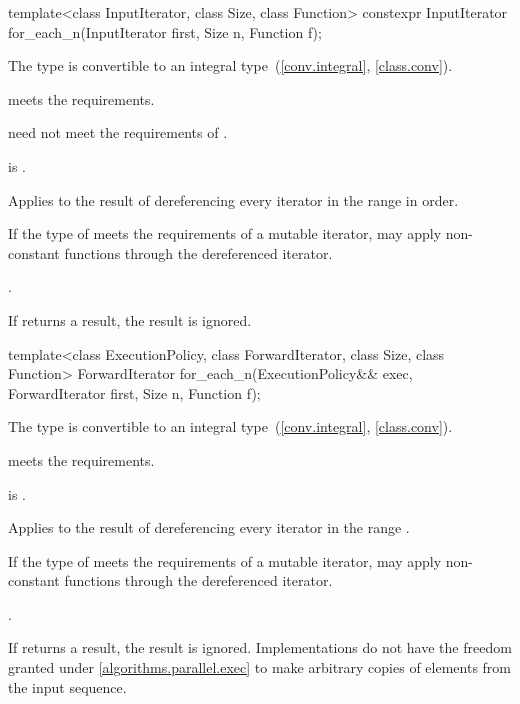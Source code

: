 %
\begin{itemdecl}
template<class InputIterator, class Size, class Function>
  constexpr InputIterator for_each_n(InputIterator first, Size n, Function f);
\end{itemdecl}

\begin{itemdescr}
\pnum
\mandates
The type  is convertible
to an integral type~(\ref{conv.integral}, \ref{class.conv}).

\pnum
\expects
{} meets the  requirements.
\begin{note}
 need not meet
the requirements of .
\end{note}

\pnum
\expects
{} is .

\pnum
\effects
Applies  to the result of dereferencing
every iterator in the range  in order.
\begin{note}
If the type of  meets the requirements of a mutable iterator,
 may apply non-constant functions through the dereferenced iterator.
\end{note}

\pnum
\returns
{}.

\pnum
\remarks
If  returns a result, the result is ignored.
\end{itemdescr}

%
\begin{itemdecl}
template<class ExecutionPolicy, class ForwardIterator, class Size, class Function>
  ForwardIterator for_each_n(ExecutionPolicy&& exec, ForwardIterator first, Size n,
                             Function f);
\end{itemdecl}

\begin{itemdescr}
\pnum
\mandates
The type  is convertible
to an integral type~(\ref{conv.integral}, \ref{class.conv}).

\pnum
\expects
{} meets the  requirements.

\pnum
\expects
{} is .

\pnum
\effects
Applies  to the result of dereferencing
every iterator in the range .
\begin{note}
If the type of  meets the requirements of a mutable iterator,
 may apply non-constant functions through the dereferenced iterator.
\end{note}

\pnum
\returns
{}.

\pnum
\remarks
If  returns a result, the result is ignored.
Implementations do not have
the freedom granted under \ref{algorithms.parallel.exec}
to make arbitrary copies of elements from the input sequence.
\end{itemdescr}

